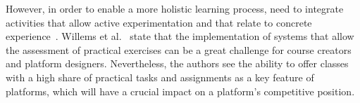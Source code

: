 However, in order to enable a more holistic learning process, \moocs need to integrate activities that allow active experimentation and that relate to concrete experience~\cite{grunewald2013designing}. Willems et al.~\cite{willems2013introducing} state that the implementation of systems that allow the assessment of practical exercises can be a great challenge for course creators and platform designers. Nevertheless, the authors see the ability to offer classes with a high share of practical tasks and assignments as a key feature of \mooc platforms, which will have a crucial impact on a platform's competitive position.
